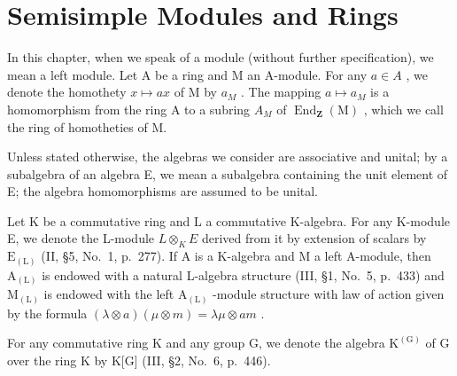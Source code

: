 \chapter{Semisimple Modules and Rings}

In this chapter, when we speak of a module (without further specification), we mean a left module. Let A be a ring and M an A-module. For any \(a \in A\) , we denote the homothety \(x \mapsto ax\) of M by \(a_{M}\) . The mapping \(a \mapsto a_{M}\) is a homomorphism from the ring A to a subring \(A_{M}\) of \(\operatorname{End}_{\mathbf{Z}}(\mathrm{M})\) , which we call the ring of homotheties of M.

Unless stated otherwise, the algebras we consider are associative and unital; by a subalgebra of an algebra E, we mean a subalgebra containing the unit element of E; the algebra homomorphisms are assumed to be unital.

Let K be a commutative ring and L a commutative K-algebra. For any K-module E, we denote the L-module \(L \otimes_{K} E\) derived from it by extension of scalars by \(\mathrm{E}_{(\mathrm{L})}\) (II, §5, No.~1, p.~277). If A is a K-algebra and M a left A-module, then \(\mathrm{A}_{(\mathrm{L})}\) is endowed with a natural L-algebra structure (III, §1, No.~5, p.~433) and \(\mathrm{M}_{(\mathrm{L})}\) is endowed with the left \(\mathrm{A}_{(\mathrm{L})}\) -module structure with law of action given by the formula \((\lambda \otimes a)(\mu \otimes m) = \lambda \mu \otimes am\) .

For any commutative ring K and any group G, we denote the algebra \(\mathrm{K}^{(\mathrm{G})}\) of G over the ring K by K{[}G{]} (III, §2, No.~6, p.~446).

